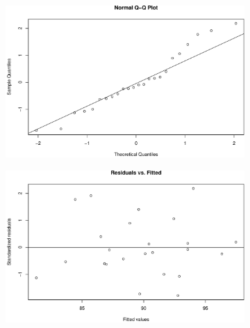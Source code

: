\documentclass[
  letterpaper,
]{scrbook}
\begin{document}
\begin{figure}

\begin{minipage}{0.50\linewidth}

\begin{figure}[H]

{\centering \includegraphics{unit5-factor/crbd_files/figure-pdf/plot-diagnostics-rcbd-1.pdf}

}


\end{figure}%

\end{minipage}%
%
\begin{minipage}{0.50\linewidth}

\begin{figure}[H]

{\centering \includegraphics{unit5-factor/crbd_files/figure-pdf/plot-diagnostics-rcbd-2.pdf}

}
\end{figure}
\end{minipage}
\end{figure}
\end{document}
